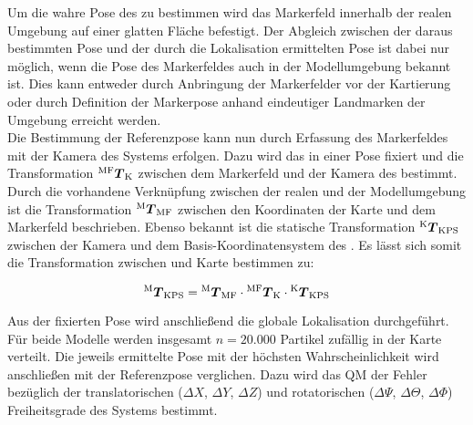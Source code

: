 
Um die wahre Pose des  zu bestimmen wird das Markerfeld innerhalb der realen Umgebung auf einer glatten Fläche befestigt. Der Abgleich zwischen der daraus bestimmten Pose und der durch die Lokalisation ermittelten Pose ist dabei nur möglich, wenn die Pose des Markerfeldes auch in der Modellumgebung bekannt ist. Dies kann entweder durch Anbringung der Markerfelder vor der Kartierung oder durch Definition der Markerpose anhand eindeutiger Landmarken der Umgebung erreicht werden.\\

Die Bestimmung der Referenzpose kann nun durch Erfassung des Markerfeldes mit der Kamera des Systems erfolgen. Dazu wird das \kps{} in einer Pose fixiert und die Transformation ${^{\mathrm{MF}}\mbox{\boldmath{$T$}}_{\mathrm{K}}}$ zwischen dem Markerfeld und der Kamera des  bestimmt. Durch die vorhandene Verknüpfung zwischen der realen und der Modellumgebung ist die Transformation ${^{\mathrm{M}}\mbox{\boldmath{$T$}}_{\mathrm{MF}}}$ zwischen den Koordinaten der Karte und dem Markerfeld beschrieben. Ebenso bekannt ist die statische Transformation ${^{\mathrm{K}}\mbox{\boldmath{$T$}}_{\mathrm{KPS}}}$ zwischen der Kamera und dem Basis-Koordinatensystem des . Es lässt sich somit die Transformation zwischen \kps{} und Karte bestimmen zu:


\begin{equation}
{^{\mathrm{M}}\mbox{\boldmath{$T$}}_{\mathrm{KPS}}} = {^{\mathrm{M}}\mbox{\boldmath{$T$}}_{\mathrm{MF}}} \cdot {^{\mathrm{MF}}\mbox{\boldmath{$T$}}_{\mathrm{K}}} \cdot {^{\mathrm{K}}\mbox{\boldmath{$T$}}_{\mathrm{KPS}}}
\end{equation}

Aus der fixierten Pose wird anschließend die globale Lokalisation durchgeführt. Für beide Modelle werden insgesamt $n=20.000$ Partikel zufällig in der Karte verteilt. Die jeweils ermittelte Pose mit der höchsten Wahrscheinlichkeit wird anschließen mit der Referenzpose verglichen. Dazu wird das QM der Fehler bezüglich der translatorischen ($\Delta X$, $\Delta Y$, $\Delta Z$) und rotatorischen ($\Delta \Psi$, $\Delta \Theta$, $\Delta \Phi$) Freiheitsgrade des Systems bestimmt.\\

